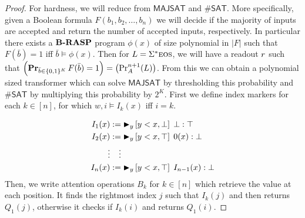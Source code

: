 \documentclass[acmsmall,screen,review,anonymous,nonacm]{PLDI/acmart}
\begin{document}
\begin{proof}
    
    

    

    For hardness, we will reduce from $\mathsf{MAJSAT}$ and $\mathsf{\#SAT}$.
    More specifically, given a Boolean formula $F(b_1,b_2,\ldots, b_n)$ we will decide if the majority of inputs are accepted and return the number of accepted inputs, respectively.
    In particular there exists a ${\textbf{B-RASP}}$ program $\phi(x)$ of size polynomial in $|F|$ such that $F(\bar{b})=1$ iff $\bar{b}\models \phi(x)$. 
    Then for $L=\Sigma^*{{\textsc{eos}}}$, we will have a readout ${r}$ such that $\left(\mathop{\mathbf{Pr}}_{\bar{b}\in\{0,1\}^K} F(\bar{b})=1\right)=\left({\textnormal{Pr}^{n+1}_{{A}}(L)}\right)$. 
    From this we can obtain a polynomial sized transformer which can solve $\mathsf{MAJSAT}$ by thresholding this probability and $\mathsf{\#SAT}$ by multiplying this probability by $2^{K}$.
    First we define index markers for each $k\in[n]$, for which $w,i\models I_k(x)$ iff $i=k$.

    \begin{align*}
        I_1(x) &:= {{{{\blacktriangleright}}_{y} \left[y<x, \bot\right] \; \bot : \top}}\\
        I_2(x) &:= {{{{\blacktriangleright}}_{y} \left[y<x, \top\right] \; 0(x) : \bot}}\\
        \vdots &\phantom{:=} \vdots\\
        I_n(x) &:= {{{{\blacktriangleright}}_{y} \left[y<x, \top\right] \; I_{n-1}(x) : \bot}}
    \end{align*}
    Then, we write attention operations $B_k$ for $k\in[n]$ which retrieve the value at each position.
    It finds the rightmost index $j$ such that $I_k(j)$ and then returns $Q_1(j)$, otherwise it checks if $I_k(i)$ and returns $Q_1(i)$.


\end{proof}
\end{document}
